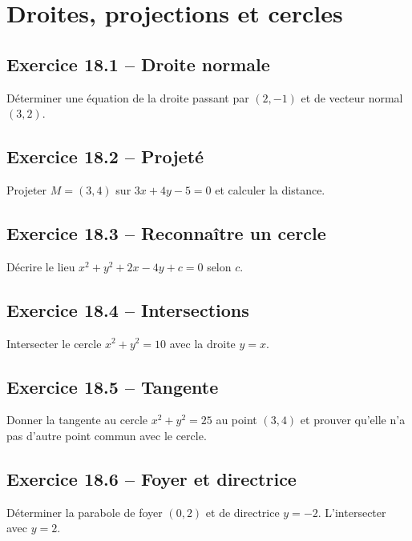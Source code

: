 \chapter{Droites, projections et cercles}
\section*{Exercice 18.1 -- Droite normale}
Déterminer une équation de la droite passant par $(2,-1)$ et de vecteur normal $(3,2)$.

\section*{Exercice 18.2 -- Projeté}
Projeter $M=(3,4)$ sur $3x+4y-5=0$ et calculer la distance.

\section*{Exercice 18.3 -- Reconnaître un cercle}
Décrire le lieu $x^2+y^2+2x-4y+c=0$ selon $c$.

\section*{Exercice 18.4 -- Intersections}
Intersecter le cercle $x^2+y^2=10$ avec la droite $y=x$.

\section*{Exercice 18.5 -- Tangente}
Donner la tangente au cercle $x^2+y^2=25$ au point $(3,4)$ et prouver qu'elle n'a pas d'autre point commun avec le cercle.

\section*{Exercice 18.6 -- Foyer et directrice}
Déterminer la parabole de foyer $(0,2)$ et de directrice $y=-2$. L'intersecter avec $y=2$.
